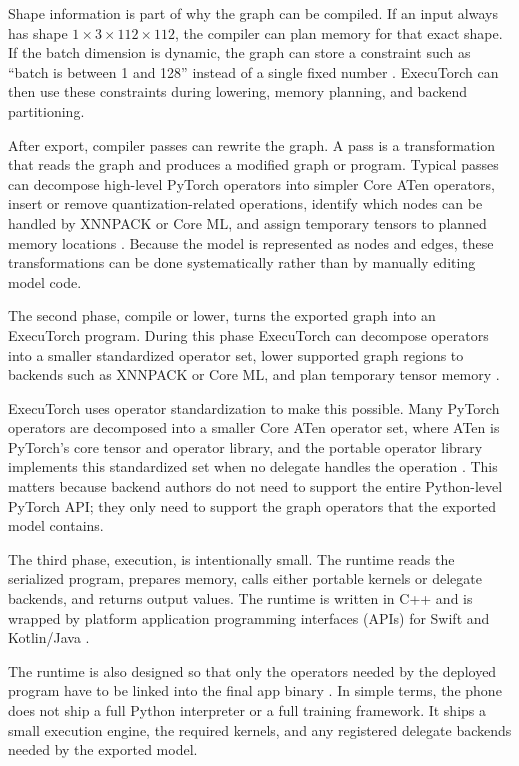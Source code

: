 Shape information is part of why the graph can be compiled. If an input always
has shape \(1 \times 3 \times 112 \times 112\), the compiler can plan memory
for that exact shape. If the batch dimension is dynamic, the graph can store a
constraint such as ``batch is between 1 and 128'' instead of a single fixed
number \cite{pytorch_export}. ExecuTorch can then use these constraints during
lowering, memory planning, and backend partitioning.

After export, compiler passes can rewrite the graph. A pass is a transformation
that reads the graph and produces a modified graph or program. Typical passes
can decompose high-level PyTorch operators into simpler Core ATen operators,
insert or remove quantization-related operations, identify which nodes can be
handled by XNNPACK or Core ML, and assign temporary tensors to planned memory
locations \cite{executorch_how,executorch_arch,executorch_delegate,executorch_memory}.
Because the model is represented as nodes and edges, these transformations can
be done systematically rather than by manually editing model code.

The second phase, compile or lower, turns the exported graph into an
ExecuTorch program. During this phase ExecuTorch can decompose operators into a
smaller standardized operator set, lower supported graph regions to backends
such as XNNPACK or Core ML, and plan temporary tensor memory
\cite{executorch_arch,executorch_delegate,executorch_memory}.

ExecuTorch uses operator standardization to make this possible. Many PyTorch
operators are decomposed into a smaller Core ATen operator set, where ATen is
PyTorch's core tensor and operator library, and the portable operator library
implements this standardized set when no delegate handles the operation
\cite{executorch_how,executorch_arch}. This matters because backend authors do
not need to support the entire Python-level PyTorch API; they only need to
support the graph operators that the exported model contains.

The third phase, execution, is intentionally small. The runtime reads the
serialized program, prepares memory, calls either portable kernels or delegate
backends, and returns output values. The runtime is written in C++ and is
wrapped by platform application programming interfaces (APIs) for Swift and
Kotlin/Java \cite{executorch_how,executorch_android,executorch_ios}.

The runtime is also designed so that only the operators needed by the deployed
program have to be linked into the final app binary \cite{executorch_how}. In
simple terms, the phone does not ship a full Python interpreter or a full
training framework. It ships a small execution engine, the required kernels,
and any registered delegate backends needed by the exported model.

